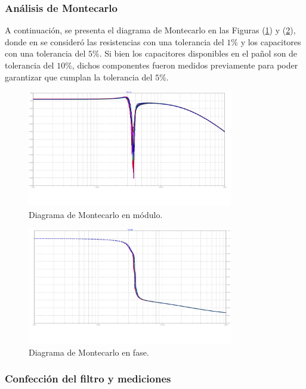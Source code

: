 \subsubsection{Análisis de Montecarlo}
A continuación, se presenta el diagrama de Montecarlo en las Figuras (\ref{fig:mc-mod}) y (\ref{fig:mc-pha}), donde en se consideró las resistencias con una tolerancia del $1\%$ y los capacitores con una tolerancia del $5\%$. Si bien los capacitores disponibles en el pañol son de tolerancia del $10\%$, dichos componentes fueron medidos previamente para poder garantizar que cumplan la tolerancia del $5\%$.
\begin{figure}[H]
\centering
	\includegraphics[width=0.8\textwidth,trim={0 3.5cm 1.5cm 0},clip]{ImagenesEjercicio4/MC-Mod-4.png}
	\caption{Diagrama de Montecarlo en módulo.}
	\label{fig:mc-mod}
\end{figure}
\begin{figure}[H]
\centering
	\includegraphics[width=0.8\textwidth,trim={1.25cm 3.5cm 0 0},clip]{ImagenesEjercicio4/MC-Pha-4.png}
	\caption{Diagrama de Montecarlo en fase.}
	\label{fig:mc-pha}
\end{figure}

\subsubsection{Confección del filtro y mediciones}


